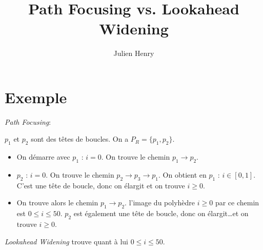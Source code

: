 \documentclass[a4paper,english,11pt]{article}
\title{Path Focusing vs. Lookahead Widening}
\author{Julien Henry}
\begin{document}
\maketitle

\section{Exemple}

\begin{figure}[!h]
\centering
{}
\end{figure}

\emph{Path Focusing}:

$p_1$ et $p_2$ sont des têtes de boucles. On a $P_R = \{p_1, p_2\}$.
\begin{itemize}
\item On démarre avec $p_1$ : $i=0$. On trouve le chemin $p_1 \rightarrow p_2$.
\item $p_2$ : $i=0$. On trouve le chemin $p_2 \rightarrow p_3 \rightarrow p_1$.
On obtient en $p_1$ : $i \in [0,1]$. C'est une tête de boucle, donc on élargit
et on trouve $i \geq 0$.
\item On trouve alors le chemin $p_1 \rightarrow p_2$. l'image du polyhèdre $i
\geq 0$ par ce chemin est $0 \leq i \leq 50$. $p_2$ est également une tête de
boucle, donc on élargit\dots et on trouve $i \geq 0$.
\end{itemize}

\emph{Lookahead Widening} trouve quant à lui $0 \leq i \leq 50$.
\end{document}
